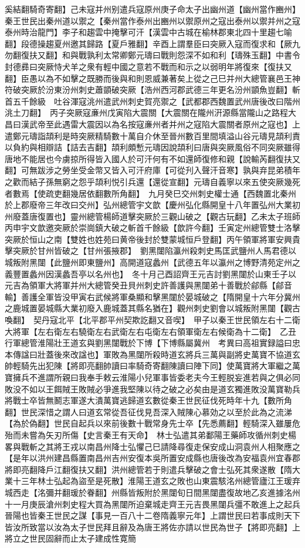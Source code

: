 奚結翻騎奇寄翻】己未寇并州别遣兵寇原州庚子命太子出幽州道【幽州當作豳州】秦王世民出秦州道以禦之【秦州當作泰州出豳州以禦原州之寇出泰州以禦并州之寇泰州時治龍門】李子和趨雲中掩擊可汗【漢雲中古城在榆林郡東北四十里趨七喻翻】段德操趨夏州邀其歸路【夏戶雅翻】辛酉上謂羣臣曰突厥入寇而復求和【厥九勿翻復扶又翻】和與戰孰利太常卿鄭元璹曰戰則怨深不如和利【璹殊玉翻】中書令封德彞曰突厥恃犬羊之衆有輕中國之意若不戰而和示之以弱明年將復來【復扶又翻】臣愚以為不如擊之既勝而後與和則恩威兼著矣上從之己巳并州大總管襄邑王神符破突厥於汾東汾州刺史蕭顗破突厥【浩州西河郡武德三年更名汾州顗魚豈翻】斬首五千餘級　吐谷渾寇洮州遣武州刺史賀亮禦之【武都郡西魏置武州唐後改曰階州洮土刀翻】　丙子突厥寇亷州戊寅陷大震關【大震關在隴州汧源縣當隴山之路程大昌曰漢武帝至此遇雷大震因以為名按寇亷州者并州之寇陷大震關者原州之寇也】上遣鄭元璹詣頡利是時突厥精騎數十萬自介休至晉州數百里間填溢山谷元璹見頡利責以負約與相辯詰【詰去吉翻】頡利頗慙元璹因說頡利曰唐與突厥風俗不同突厥雖得唐地不能居也今虜掠所得皆入國人於可汗何有不如還師復修和親【說輸芮翻復扶又翻】可無跋涉之勞坐受金幣又皆入可汗府庫【可從刋入聲汗音寒】孰與弃昆弟積年之歡而結子孫無窮之怨乎頡利悦引兵還【還從宣翻】元璹自義寧以來五使突厥幾死者數焉【使疏吏翻幾居依翻數所角翻】　九月癸巳交州刺史權士通【西魏置北秦州於上郡廢帝三年改曰交州】弘州總管宇文歆【慶州弘化縣開皇十八年置弘州大業初州廢蓋唐復置也】靈州總管楊師道擊突厥於三觀山破之【觀古玩翻】乙未太子班師丙申宇文歆邀突厥於崇崗鎮大破之斬首千餘級【歆許今翻】壬寅定州總管雙士洛擊突厥於恒山之南【雙姓也姓苑曰黄帝後封於雙蒙城恒戶登翻】丙午領軍將軍安興貴擊突厥於甘州皆破之【甘州張掖郡】　劉黑闥陷瀛州殺刺史馬匡武鹽州人馬君德以城叛附黑闥【此鹽州即東鹽州】高開道寇蠡州【武德五年以瀛州之博野清苑定州之義豐置蠡州因漢蠡吾亭以名州也】　冬十月己酉詔齊王元吉討劉黑闥於山東壬子以元吉為領軍大將軍并州大總管癸丑貝州刺史許善護與黑闥弟十善戰於鄃縣【鄃音輸】善護全軍皆没甲寅右武候將軍桑顯和擊黑闥於晏城破之【隋開皇十六年分冀州之鹿城置晏城縣大業初廢入鹿城蓋其縣名猶在】觀州刺史劉會以城叛附黑闥【觀古喚翻】　契丹寇北平【北平郡平州契欺訖翻又音喫】　甲子以秦王世民領左右十二衛大將軍【左右衛左右驍衛左右武衛左右屯衛左右領軍衛左右候衛為十二衛】　乙丑行軍總管淮陽壯王道玄與劉黑闥戰於下博【下博縣屬冀州　考異曰高祖實録謚曰忠本傳諡曰壯蓋後來改諡也】軍敗為黑闥所殺時道玄將兵三萬與副將史萬寶不協道玄帥輕騎先出犯陳【將即亮翻帥讀曰率騎奇寄翻陳讀曰陣下同】使萬寶將大軍繼之萬寶擁兵不進謂所親曰我奉手敕云淮陽小兒軍事皆委老夫今王輕脱妄進若與之俱必同敗没不如以王餌賊王敗賊必爭進我堅陳以待之破之必矣由是道玄獨進敗没萬寶勒兵將戰士卒皆無鬭志軍遂大潰萬寶逃歸道玄數從秦王世民征伐死時年十九【數所角翻】世民深惜之謂人曰道玄常從吾征伐見吾深入賊陳心慕効之以至於此為之流涕【為於偽翻】世民自起兵以來前後數十戰常身先士卒【先悉薦翻】輕騎深入雖屢危殆而未嘗為矢刃所傷【史言秦王有天命】　林士弘遣其弟鄱陽王藥師攻循州刺史楊畧與戰斬之其將王戎以南昌州降士弘懼己巳請降尋復走保安成山洞袁州人相聚應之【是年以洪州建昌縣置南昌州吉州安復本吳所置安成縣也唐後改為安福袁州宜春郡將即亮翻降戶江翻復扶又翻】洪州總管若于則遣兵擊破之會士弘死其衆遂散【隋大業十三年林士弘起為盜至是死散】淮陽王道玄之敗也山東震駭洺州總管廬江王瑗弃城西走【洺彌并翻瑗於眷翻】州縣皆叛附於黑闥旬日間黑闥盡復故地乙亥進據洺州十一月庚辰滄州刺史程大買為黑闥所迫棄城走齊王元吉畏黑闥兵彊不敢進上之起兵晉陽也皆秦王世民之謀【事見一百八十二卷隋義寧元年】上謂世民曰若事成則天下皆汝所致當以汝為太子世民拜且辭及為唐王將佐亦請以世民為世子【將即亮翻】上將立之世民固辭而止太子建成性寛簡